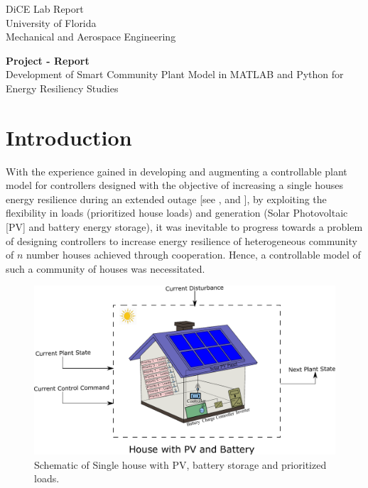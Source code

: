 \documentclass[11pt,usenames]{article}
\title{}
\date{}
\begin{document}
	


	\begin{center}
	{\sc DiCE Lab Report}\\
	University of Florida \\
	Mechanical and Aerospace Engineering
	\vspace{0.5 cm}
\end{center}

{\large \begin{center}
		\textbf{Project - Report}\\
		Development of Smart Community Plant Model in MATLAB and Python for Energy Resiliency Studies
\end{center}}


\newpage


\tableofcontents


\newpage


\section{Introduction}\label{section:Introduction}
With the experience gained in developing and augmenting a controllable plant model for controllers designed with the objective of increasing a single houses energy resilience during an extended outage [see \cite{GaikwadSmart:2020}, \cite{GaikwadIncreasing:2021} and \cite{GaikwadReinforcementt:2021}], by exploiting the flexibility in loads (prioritized house loads) and generation (Solar Photovoltaic [PV] and battery energy storage), it was inevitable to progress towards a problem of designing controllers to increase energy resilience of heterogeneous community of $n$ number houses achieved through cooperation. Hence, a controllable model of such a community of houses was necessitated.

\begin{figure}[htpb]
	\centering
	\includegraphics[scale=0.8]{SingleHouse_PV_Bat_Schematic.pdf}
	\caption{Schematic of Single house with PV, battery storage and prioritized loads.}
	\label{fig:SingleHouse_Schematic}
\end{figure}
\end{document}
